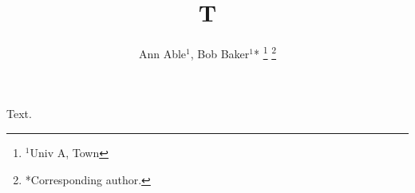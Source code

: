 \documentclass[conference]{IEEEtran}
\begin{document}
\title{T}
\author{Ann Able$^{1}$, Bob Baker$^{1}$*%
\thanks{$^{1}$Univ A, Town}%
\thanks{*Corresponding author.}}
\maketitle
Text.
\end{document}
